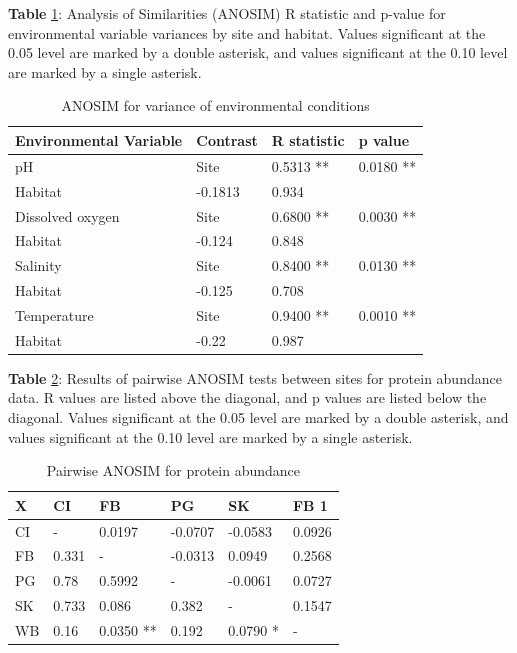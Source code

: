 \documentclass [11pt, proquest] {uwthesis}[2015/03/03]
\begin{document}
\textbf{Table} \ref{tab:envvariance}: Analysis of Similarities (ANOSIM) R statistic and p-value for environmental variable variances by site and habitat. Values significant at the 0.05 level are marked by a double asterisk, and values significant at the 0.10 level are marked by a single asterisk.

\begingroup\fontsize{10}{12}\selectfont
\begin{longtable}[t]{llll}
\caption{\label{tab:envvariance}ANOSIM for variance of environmental conditions}\\
\toprule
Environmental Variable & Contrast & R statistic & p value\\
\midrule
pH & Site & 0.5313 ** & 0.0180 **\\
Habitat & -0.1813 & 0.934 & \\
Dissolved oxygen & Site & 0.6800 ** & 0.0030 **\\
Habitat & -0.124 & 0.848 & \\
Salinity & Site & 0.8400 ** & 0.0130 **\\
\addlinespace
Habitat & -0.125 & 0.708 & \\
Temperature & Site & 0.9400 ** & 0.0010 **\\
Habitat & -0.22 & 0.987 & \\
\bottomrule
\end{longtable}
\endgroup{}
\clearpage

\textbf{Table} \ref{tab:protANOSIM}: Results of pairwise ANOSIM tests between sites for protein abundance data. R values are listed above the diagonal, and p values are listed below the diagonal. Values significant at the 0.05 level are marked by a double asterisk, and values significant at the 0.10 level are marked by a single asterisk.

\begingroup\fontsize{10}{12}\selectfont
\begin{longtable}[t]{llllll}
\caption{\label{tab:protANOSIM}Pairwise ANOSIM for protein abundance}\\
\toprule
X & CI & FB & PG & SK & FB 1\\
\midrule
CI & - & 0.0197 & -0.0707 & -0.0583 & 0.0926\\
FB & 0.331 & - & -0.0313 & 0.0949 & 0.2568\\
PG & 0.78 & 0.5992 & - & -0.0061 & 0.0727\\
SK & 0.733 & 0.086 & 0.382 & - & 0.1547\\
WB & 0.16 & 0.0350 ** & 0.192 & 0.0790 * & -\\
\bottomrule
\end{longtable}
\endgroup{}
\clearpage
\end{document}
